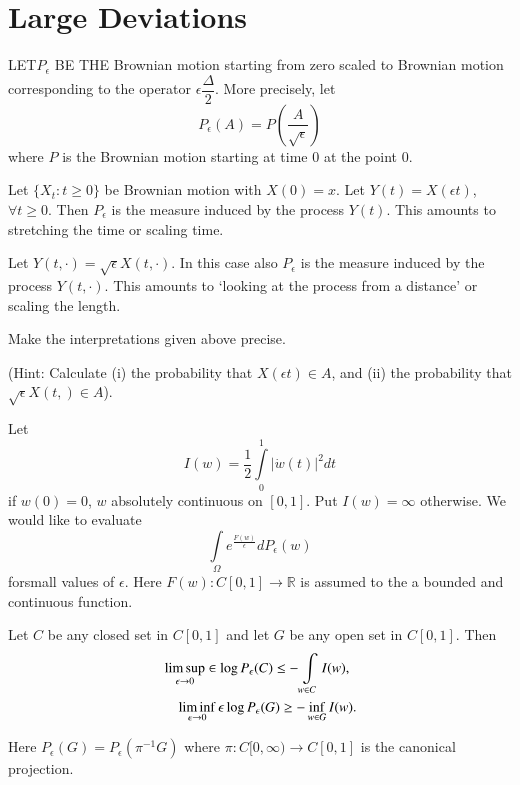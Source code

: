 \chapter{Large Deviations}\label{chap22}

LET\pageoriginale $P_{\epsilon}$ BE THE Brownian motion starting from
zero scaled to Brownian motion corresponding to the operator
$\epsilon\dfrac{\Delta}{2}$. More precisely, let
$$
P_{\epsilon}(A)=P\left(\frac{A}{\sqrt{\epsilon}}\right)
$$
where $P$ is the Brownian motion starting at time $0$ at the point
$0$.

\begin{interpretation}\label{chap22-inter1}
Let $\{X_{t}:t\geq 0\}$ be Brownian motion with $X(0)=x$. Let
$Y(t)=X(\epsilon t)$, $\forall t\geq 0$. Then $P_{\epsilon}$ is the
measure induced by the process $Y(t)$. This amounts to stretching the
time or scaling time.
\end{interpretation}

\begin{interpretation}\label{chap22-inter2}
Let $Y(t,\cdot)=\surd\epsilon X(t,\cdot)$. In this case also
$P_{\epsilon}$ is the measure induced by the process
$Y(t,\cdot)$. This amounts to `looking at the process from a distance'
or scaling the length.
\end{interpretation}

\begin{exer*}
Make the interpretations given above precise.

\noindent
(Hint: Calculate (i) the probability that $X(\epsilon t)\in A$, and
(ii) the probability that $\surd\epsilon X(t,)\in A$).
\end{exer*}

\begin{problem*}
Let
$$
I(w)=\frac{1}{2}\int\limits^{1}_{0}|\dot{w}(t)|^{2}dt
$$
if $w(0)=0$, $w$ absolutely continuous on $[0,1]$. Put $I(w)=\infty$
otherwise. We would like to evaluate
$$
\int\limits_{\Omega}e^{\frac{F(w)}{\epsilon}}dP_{\epsilon}(w)
$$
for\pageoriginale small values of $\epsilon$. Here $F(w):C[0,1]\to
\mathbb{R}$ is 
assumed to the a bounded and continuous function.
\end{problem*}


\begin{theorem*}
Let $C$ be any closed set in $C[0,1]$ and let $G$ be any open set in
$C[0,1]$. Then
\begin{align*}
&\mathop{\lim\sup}\limits_{\epsilon\to 0}\in\log P_{\epsilon}(C)\leq
  -\int\limits_{w\in C}I(w),\\
&\quad \mathop{\lim\inf}_{\epsilon\to 0}\epsilon \log P_{\epsilon}(G)\geq
  -\inf\limits_{w\in G}I(w).
\end{align*}

Here $P_{\epsilon}(G)=P_{\epsilon}(\pi^{-1}G)$ where
$\pi:C[0,\infty)\to C[0,1]$ is the canonical projection.
\end{theorem*}

